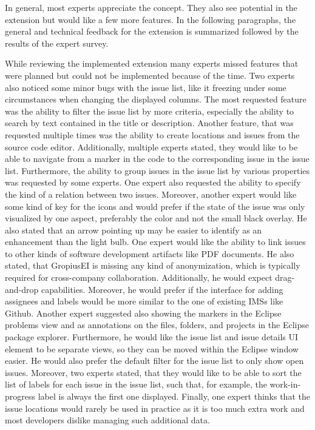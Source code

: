 In general, most experts appreciate the concept.
They also see potential in the extension but would like a few more features.
In the following paragraphs, the general and technical feedback for the extension is summarized followed by the results of the expert survey.

While reviewing the implemented extension many experts missed features that were planned but could not be implemented because of the time.
Two experts also noticed some minor bugs with the issue list, like it freezing under some circumstances when changing the displayed columns.
The most requested feature was the ability to filter the issue list by more criteria, especially the ability to search by text contained in the title or description.
Another feature, that was requested multiple times was the ability to create locations and issues from the source code editor.
Additionally, multiple experts stated, they would like to be able to navigate from a marker in the code to the corresponding issue in the issue list.
Furthermore, the ability to group issues in the issue list by various properties was requested by some experts.
One expert also requested the ability to specify the kind of a relation between two issues.
Moreover, another expert would like some kind of key for the icons and would prefer if the state of the issue was only visualized by one aspect, preferably the color and not the small black overlay. He also stated that an arrow pointing up may be easier to identify as an enhancement than the light bulb.
One expert would like the ability to link issues to other kinds of software development artifacts like \gls{PDF} documents.
He also stated, that \gls{GropiusEI} is missing any kind of anonymization, which is typically required for cross-company collaboration.
Additionally, he would expect drag-and-drop capabilities.
Moreover, he would prefer if the interface for adding assignees and labels would be more similar to the one of existing \glspl{IMS} like Github.
Another expert suggested also showing the markers in the \gls{Eclipse} problems view and as annotations on the files, folders, and projects in the \gls{Eclipse} package explorer.
Furthermore, he would like the issue list and issue details \gls{UI} element to be separate views, so they can be moved within the \gls{Eclipse} window easier.
He would also prefer the default filter for the issue list to only show open issues.
Moreover, two experts stated, that they would like to be able to sort the list of labels for each issue in the issue list, such that, for example, the work-in-progress label is always the first one displayed.
Finally, one expert thinks that the issue locations would rarely be used in practice as it is too much extra work and most developers dislike managing such additional data.

